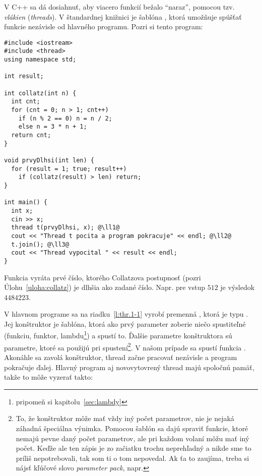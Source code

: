 V C++ sa dá dosiahnuť, aby viacero funkcií bežalo ``naraz'', pomocou tzv. {\em vlákien} ({\em  threads}). 
V štandardnej knižnici  je šablóna , ktorá umožňuje spúšťať funkcie nezávisle od
hlavného programu. Pozri si tento program:

\begin{lstlisting}[label={l:thr.1}]
#include <iostream>
#include <thread>
using namespace std;

int result;

int collatz(int n) {
  int cnt;
  for (cnt = 0; n > 1; cnt++)
    if (n % 2 == 0) n = n / 2;
    else n = 3 * n + 1;
  return cnt;
}

void prvyDlhsi(int len) {
  for (result = 1; true; result++)
    if (collatz(result) > len) return;
}

int main() {
  int x;
  cin >> x;
  thread t(prvyDlhsi, x); @\ll1@
  cout << "Thread t pocita a program pokracuje" << endl; @\ll2@
  t.join(); @\ll3@
  cout << "Thread vypocital " << result << endl;
}

\end{lstlisting}

Funkcia  vyráta prvé číslo, ktorého Collatzova postupnosť 
(pozri Úlohu~\ref{uloha:collatz}) je dlhšia ako zadané číslo. Napr. pre vstup $512$
je výsledok $4484223$. 

V hlavnom programe sa na riadku~\ref{l:thr.1-1} vyrobí premenná , ktorá je typu .
Jej konštruktor je šablóna, ktorá ako prvý parameter zoberie niečo spustiteľné (funkciu, 
funktor, lambdu\footnote{pripomeň si kapitolu~\ref{sec:lambdy}}) 
a spustí to. Ďalšie parametre konštruktora sú parametre, ktoré
sa použijú pri spustení\footnote{To, že konštruktor  
môže mať vždy iný počet parametrov, nie je nejaká záhadná špeciálna výnimka.
Pomocou šablón sa dajú spraviť funkcie, ktoré nemajú
pevne daný počet parametrov, ale pri každom volaní môžu mať 
iný počet. Keďže ale ten zápis je zo začiatku trochu neprehľadný a nikde sme to príliš nepotrebovali,
tak som ti o tom nepovedal. Ak ťa to zaujíma, treba si nájsť kľúčové slovo {\em parameter pack},
napr. 
}. V našom prípade sa spustí funkcia .
Akonáhle sa zavolá konštruktor, thread začne pracovať nezávisle a program 
pokračuje ďalej. Hlavný program aj novovytovrený thread majú spoločnú pamäť, takže
to môže vyzerať takto:

